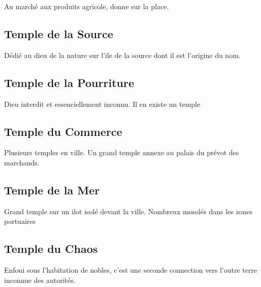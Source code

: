 Au marché aux produits agricole, donne sur la place.

\subsection{Temple de la Source}

Dédié au dieu de la nature sur l'ile de la source dont il est l'origine du nom.

\subsection{Temple de la Pourriture}

Dieu interdit et essenciellement inconnu. Il en existe un temple

\subsection{Temple du Commerce}

Plusieurs temples en ville. Un grand temple annexe au palais du prévot des marchands.

\subsection{Temple de la Mer}

Grand temple sur un ilot isolé devant la ville. Nombreux mosolés dans les zones portuaires

\subsection{Temple du Chaos}

Enfoui sous l'habitation de nobles, c'est une seconde connection vers l'outre terre inconnue des
autorités.


